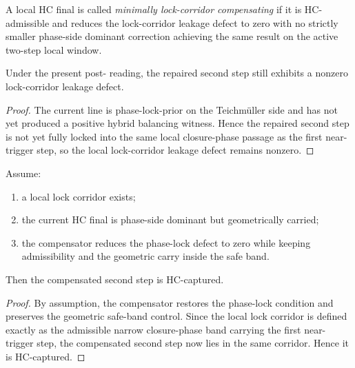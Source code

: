 \begin{definition}
\label{def:minimal-local-lock-corridor-compensation}
A local HC final is called \emph{minimally lock-corridor compensating} if it is HC-admissible and reduces the lock-corridor leakage defect to zero with no strictly smaller phase-side dominant correction achieving the same result on the active two-step local window.
\end{definition}

\begin{proposition}
\label{prop:current-line-still-exhibits-lock-corridor-leakage}
Under the present post- reading, the repaired second step still exhibits a nonzero lock-corridor leakage defect.
\end{proposition}

\begin{proof}
The current line is phase-lock-prior on the Teichm\"uller side and has not yet produced a positive hybrid balancing witness. Hence the repaired second step is not yet fully locked into the same local closure-phase passage as the first near-trigger step, so the local lock-corridor leakage defect remains nonzero.
\end{proof}

\begin{lemma}
\label{lem:phase-side-dominant-hc-yields-lock-corridor-capture}
Assume:
\begin{enumerate}[leftmargin=2em,label=(\alph*)]
 \item a local lock corridor exists;
 \item the current HC final is phase-side dominant but geometrically carried;
 \item the compensator reduces the phase-lock defect to zero while keeping admissibility and the geometric carry inside the safe band.
\end{enumerate}
Then the compensated second step is HC-captured.
\end{lemma}

\begin{proof}
By assumption, the compensator restores the phase-lock condition and preserves the geometric safe-band control. Since the local lock corridor is defined exactly as the admissible narrow closure-phase band carrying the first near-trigger step, the compensated second step now lies in the same corridor. Hence it is HC-captured.
\end{proof}

